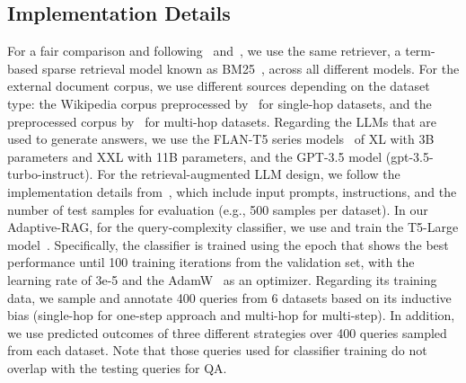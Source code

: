 \subsection{Implementation Details}
For a fair comparison and following~\citet{adaptiveRetrieval} and~\citet{ircot}, we use the same retriever, a term-based sparse retrieval model known as BM25~\cite{bm25}, across all different models. For the external document corpus, we use different sources depending on the dataset type: the Wikipedia corpus preprocessed by~\citet{DPR} for single-hop datasets, and the preprocessed corpus by~\citet{ircot} for multi-hop datasets. Regarding the LLMs that are used to generate answers, we use the FLAN-T5 series models~\cite{flan} of XL with 3B parameters and XXL with 11B parameters, and the GPT-3.5 model (gpt-3.5-turbo-instruct). For the retrieval-augmented LLM design, we follow the implementation details from~\citet{ircot}, which include input prompts, instructions, and the number of test samples for evaluation (e.g., 500 samples per dataset). In our Adaptive-RAG, for the query-complexity classifier, we use and train the T5-Large model~\cite{t5}. Specifically, the classifier is trained using the epoch that shows the best performance until 100 training iterations from the validation set, with the learning rate of 3e-5 and the AdamW~\cite{adamw} as an optimizer. Regarding its training data, we sample and annotate 400 queries from 6 datasets based on its inductive bias (single-hop for one-step approach and multi-hop for multi-step). In addition, we use predicted outcomes of three different strategies over 400 queries sampled from each dataset. Note that those queries used for classifier training do not overlap with the testing queries for QA.

